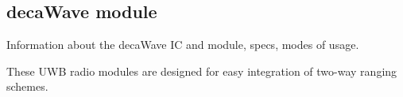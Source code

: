 \subsection{decaWave module}

Information about the decaWave IC and module, specs, modes of usage.

These UWB radio modules are designed for easy integration of two-way ranging schemes.